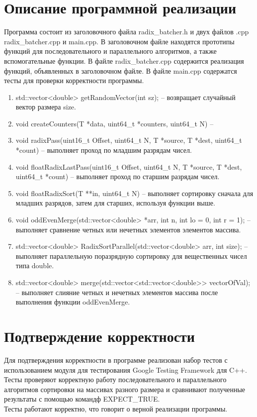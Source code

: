 \documentclass{report}
\begin{document}
\section*{Описание программной реализации}
Программа состоит из заголовочного файла radix\_batcher.h и двух файлов .cpp radix\_batcher.cpp и main.cpp. В заголовочном файле находятся прототипы функций для последовательного и параллельного алгоритмов, а также вспомогательные функции. В файле radix\_batcher.cpp содержится реализация функций, объявленных в заголовочном файле. В файле main.cpp содержатся тесты для проверки корректности программы.
\begin{enumerate}
\item std::vector<double> getRandomVector(int sz); -- возвращает случайный вектор размера size.
\item void createCounters(T *data, uint64\_t *counters, uint64\_t N) --
\item void radixPass(uint16\_t Offset, uint64\_t N, T *source, T *dest, uint64\_t *count) -- выполняет проход по младшим разрядам чисел.
\item void floatRadixLastPass(uint16\_t Offset, uint64\_t N, T *source, T *dest, uint64\_t *count) -- выполняет проход по старшим разрядам чисел.
\item void floatRadixSort(T **in, uint64\_t N) -- выполняет сортировку сначала для младших разрядов, затем для старших, используя функции выше.
\item void oddEvenMerge(std::vector<double> *arr, int n, int lo = 0, int r = 1); -- выполняет сравнение четных или нечетных элементов элементов массива.
\item std::vector<double> RadixSortParallel(std::vector<double> arr, int size); --выполняет параллельную поразрядную сортировку для вещественных чисел типа double.
\item std::vector<double> merge(std::vector<std::vector<double>> vectorOfVal); -- выполняет слияние четных и нечетных элементов массива после выполнения функции oddEvenMerge.
\end{enumerate}
\newpage
\section*{Подтверждение корректности}
Для подтверждения корректности в программе реализован набор тестов с использованием модуля для тестирования Google Testing Framework для C++.
Тесты проверяют корректную работу последовательного и параллельного алгоритмов
сортировки на массивах разного размера и сравнивают полученные результаты с помощью командф EXPECT\_TRUE. \\
Тесты работают корректно, что говорит о верной реализации программы.
\newpage
\end{document}

